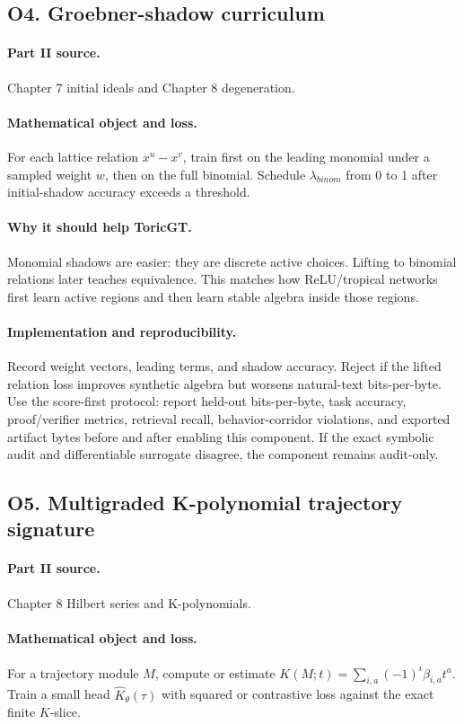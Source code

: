 \documentclass[11pt]{article}
\theoremstyle{definition}
\begin{document}
\subsection{O4. Groebner-shadow curriculum}
\paragraph{Part II source.} Chapter 7 initial ideals and Chapter 8 degeneration.
\paragraph{Mathematical object and loss.} For each lattice relation $x^u-x^v$, train first on the leading monomial under a sampled weight $w$, then on the full binomial.  Schedule $\lambda_{binom}$ from 0 to 1 after initial-shadow accuracy exceeds a threshold.
\paragraph{Why it should help ToricGT.} Monomial shadows are easier: they are discrete active choices.  Lifting to binomial relations later teaches equivalence.  This matches how ReLU/tropical networks first learn active regions and then learn stable algebra inside those regions.
\paragraph{Implementation and reproducibility.} Record weight vectors, leading terms, and shadow accuracy.  Reject if the lifted relation loss improves synthetic algebra but worsens natural-text bits-per-byte.  Use the score-first protocol: report held-out bits-per-byte, task accuracy, proof/verifier metrics, retrieval recall, behavior-corridor violations, and exported artifact bytes before and after enabling this component.  If the exact symbolic audit and differentiable surrogate disagree, the component remains audit-only.


\subsection{O5. Multigraded K-polynomial trajectory signature}
\paragraph{Part II source.} Chapter 8 Hilbert series and K-polynomials.
\paragraph{Mathematical object and loss.} For a trajectory module $M$, compute or estimate $K(M;t)=\sum_{i,a}(-1)^i\beta_{i,a}t^a$.  Train a small head $\hat K_\theta(\tau)$ with squared or contrastive loss against the exact finite $K$-slice.
\end{document}
